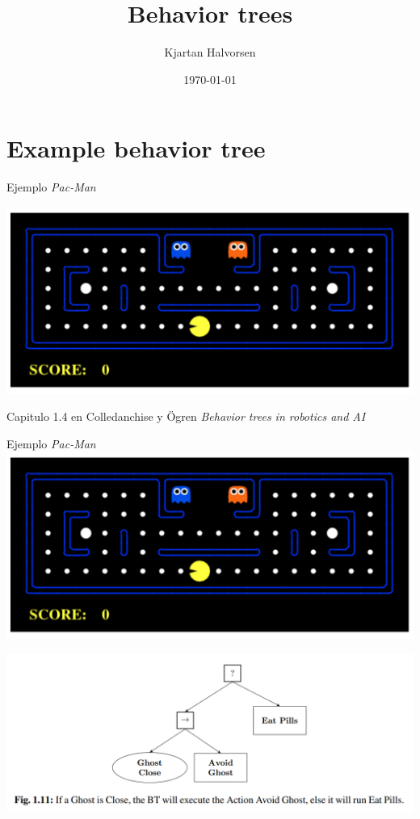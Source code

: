 \documentclass[presentation,aspectratio=169]{beamer}
\author{Kjartan Halvorsen}
\date{\today}
\title{Behavior trees}
\begin{document}
\maketitle

\section{Example behavior tree}
\label{sec:org72ffba7}

\begin{frame}[label={sec:orge11a71e}]{Ejemplo \emph{Pac-Man}}
\begin{center}
  \includegraphics[width=.8\linewidth]{../figures/bt-book-fig-1_10.png}
\end{center}

{\footnotesize Capitulo 1.4 en Colledanchise y Ögren \emph{Behavior trees in robotics and AI}}
\end{frame}

\begin{frame}[label={sec:orgd91d00f}]{Ejemplo \emph{Pac-Man}}
\includegraphics[width=0.4\linewidth]{../figures/bt-book-fig-1_10.png}

\begin{center}
  \includegraphics[width=.8\linewidth]{../figures/bt-book-fig-1_11.png}
\end{center}
\end{frame}
\end{document}
